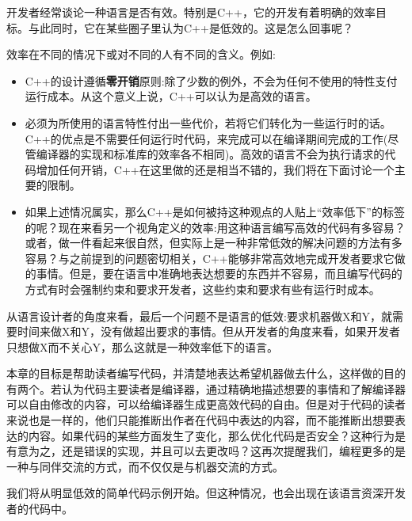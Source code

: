开发者经常谈论一种语言是否有效。特别是C++，它的开发有着明确的效率目标。与此同时，它在某些圈子里认为C++是低效的。这是怎么回事呢？

效率在不同的情况下或对不同的人有不同的含义。例如:

\begin{itemize}
\item
C++的设计遵循\textbf{零开销}原则:除了少数的例外，不会为任何不使用的特性支付运行成本。从这个意义上说，C++可以认为是高效的语言。

\item
必须为所使用的语言特性付出一些代价，若将它们转化为一些运行时的话。C++的优点是不需要任何运行时代码，来完成可以在编译期间完成的工作(尽管编译器的实现和标准库的效率各不相同)。高效的语言不会为执行请求的代码增加任何开销，C++在这里做的还是相当不错的，我们将在下面讨论一个主要的限制。

\item
如果上述情况属实，那么C++是如何被持这种观点的人贴上“效率低下”的标签的呢？现在来看另一个视角定义的效率:用这种语言编写高效的代码有多容易？或者，做一件看起来很自然，但实际上是一种非常低效的解决问题的方法有多容易？与之前提到的问题密切相关，C++能够非常高效地完成开发者要求它做的事情。但是，要在语言中准确地表达想要的东西并不容易，而且编写代码的方式有时会强制约束和要求开发者，这些约束和要求有些有运行时成本。
	
\end{itemize}

从语言设计者的角度来看，最后一个问题不是语言的低效:要求机器做X和Y，就需要时间来做X和Y，没有做超出要求的事情。但从开发者的角度来看，如果开发者只想做X而不关心Y，那么这就是一种效率低下的语言。 

本章的目标是帮助读者编写代码，并清楚地表达希望机器做去什么，这样做的目的有两个。若认为代码主要读者是编译器，通过精确地描述想要的事情和了解编译器可以自由修改的内容，可以给编译器生成更高效代码的自由。但是对于代码的读者来说也是一样的，他们只能推断出作者在代码中表达的内容，而不能推断出想要表达的内容。如果代码的某些方面发生了变化，那么优化代码是否安全？这种行为是有意为之，还是错误的实现，并且可以去更改吗？这再次提醒我们，编程更多的是一种与同伴交流的方式，而不仅仅是与机器交流的方式。

我们将从明显低效的简单代码示例开始。但这种情况，也会出现在该语言资深开发者的代码中。














